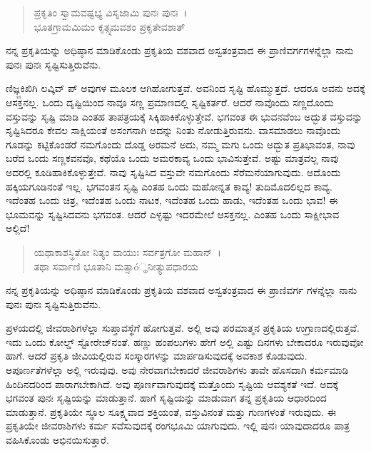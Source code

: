 \begin{verse}
ಪ್ರಕೃತಿಂ ಸ್ವಾಮವಷ್ಟಭ್ಯ ವಿಸೃಜಾಮಿ ಪುನಃ ಪುನಃ~।\\ಭೂತಗ್ರಾಮಮಿಮಂ ಕೃತ್ಸ್ನಮವಶಂ ಪ್ರಕೃತೇವಶಾತ್ 
\end{verse}

ನನ್ನ ಪ್ರಕೃತಿಯನ್ನು ಅಧಿಷ್ಠಾನ ಮಾಡಿಕೊಂಡು ಪ್ರಕೃತಿಯ ವಶವಾದ ಅಸ್ವತಂತ್ರವಾದ ಈ ಪ್ರಾಣಿವರ್ಗಗಳನ್ನೆಲ್ಲಾ ನಾನು ಪುನಃ ಪುನಃ ಸೃಷ್ಟಿಸುತ್ತಿರುವೆನು.

ಣಿಜ್ಞ್ಜಕಿಖಿಗಿ ಲವ್ಕಿವ್ ಪ್ ಅವುಗಳ ಮೂಲಕ ಆಗಿಹೋಗುತ್ತವೆ. ಅವನಿಂದ ಸೃಷ್ಟಿ ಹೊಮ್ಮುತ್ತದೆ. ಆದರೂ ಅವನು ಅದಕ್ಕೆ ಆಸಕ್ತನಲ್ಲ. ಒಂದು ದೃಷ್ಟಿಯಿಂದ ನಾವೂ ಸಣ್ಣ ಪ್ರಮಾಣದಲ್ಲಿ ಸೃಷ್ಟಿಕರ್ತರೆ. ಆದರೆ ನಾವೊಂದು ಸಣ್ಣದೊಂದು ವಸ್ತುವನ್ನು ಸೃಷ್ಟಿ ಮಾಡಿ ಎಂತಹ ತಾಪತ್ರಯಕ್ಕೆ ಸಿಕ್ಕಿಹಾಕಿಕೊಳ್ಳುತ್ತೇವೆ. ಭಗವಂತ ಈ ಭುವನವೆಂಬ ಅದ್ಭುತ ವಸ್ತುವನ್ನು ಸೃಷ್ಟಿಸಿದರೂ ಕೇವಲ ಸಾಕ್ಷಿಯಂತೆ ಅಸಂಗನಾಗಿ ಅದನ್ನು ನಿಂತು ನೋಡುತ್ತಿರುವನು. ವಾಸಮಾಡಲು ನಾವೊಂದು ಗೂಡನ್ನು ಕಟ್ಟಿಕೊಂಡರೆ ನಮಗೊಂದು ದೊಡ್ಡ ಅರಮನೆ ಅದು, ನಮ್ಮ ಮಗು ಒಂದು ಅದ್ಭುತ ಪ್ರತಿಭಾವಂತ, ನಾವು ಬರೆದ ಒಂದು ಸಣ್ಣಕವನವೊ, ಕಥೆಯೊ ಒಂದು ಅಮರಕಾವ್ಯ ಒಂದು ಭಾವಿಸುತ್ತೇವೆ. ಅಷ್ಟು ಮಾತ್ರವಲ್ಲ ನಾವು ಅದರಲ್ಲಿ ಕೂಡಿಹಾಕಿಕೊಳ್ಳುತ್ತೇವೆ. ನಾವು ಸೃಷ್ಟಿಸಿದ ವಸ್ತುವೇ ನಮಗೊಂದು ಸೆರೆಮನೆಯಾಗುವುದು. ಅದೊಂದು ಹಕ್ಕಿಯಗೂಡಿನಂತೆ ಇಲ್ಲ. ಭಗವಂತನ ಸೃಷ್ಟಿ ಎಂತಹ ಒಂದು ಮಹೋನ್ನತ ಕಾವ್ಯ! ತುದಿಮೊದಲಿಲ್ಲದ ಕಾವ್ಯ. ಇದೆಂತಹ ಒಂದು ಚಿತ್ರ, ಇದೆಂತಹ ಒಂದು ನಾಟಕ, ಇದೆಂತಹ ಒಂದು ಹಾಡು, ಇದೆಂತಹ ಒಂದು ಭಾವ! ಈ ಭೂಮವನ್ನು ಸೃಷ್ಟಿಸಿದವನು ಭಗವಂತ. ಆದರೆ ಎಳ್ಳಷ್ಟು ಇದರಮೇಲೆ ಆಸಕ್ತನಲ್ಲ. ಎಂತಹ ಒಂದು ಸಾಕ್ಷೀಭಾವ ಅಲ್ಲಿದೆ!

\begin{verse}
ಯಥಾಕಾಶಸ್ಥಿತೋ ನಿತ್ಯಂ ವಾಯುಃ ಸರ್ವತ್ರಗೋ ಮಹಾನ್~।\\ತಥಾ ಸರ್ವಾಣಿ ಭೂತಾನಿ ಮತ್ಸಾó್ಥನೀತ್ಯುಪಧಾರಯ 
\end{verse}

{\small ನನ್ನ ಪ್ರಕೃತಿಯನ್ನು ಅಧಿಷ್ಠಾನ ಮಾಡಿಕೊಂಡು ಪ್ರಕೃತಿಯ ವಶವಾದ ಅಸ್ವತಂತ್ರವಾದ ಈ ಪ್ರಾಣಿವರ್ಗ ಗಳನ್ನೆಲ್ಲಾ ನಾನು ಪುನಃ ಪುನಃ ಸೃಷ್ಟಿಸುತ್ತಿರುವೆನು.}

ಪ್ರಳಯದಲ್ಲಿ ಜೀವರಾಶಿಗಳೆಲ್ಲಾ ಸುಪ್ತಾವಸ್ಥೆಗೆ ಹೋಗುತ್ತವೆ. ಅಲ್ಲಿ ಅವು ಪರಮಾತ್ಮನ ಪ್ರಕೃತಿಯ ಉಗ್ರಾಣದಲ್ಲಿರುತ್ತವೆ. ಇದು ಒಂದು ಕೋಲ್ಡ್ ಸ್ಟೋರೇಜ್​ನಂತೆ. ಹಣ್ಣು ಹಂಪಲುಗಳು ಹೇಗೆ ಅಲ್ಲಿ ಎಷ್ಟು ದಿನಗಳು ಬೇಕಾದರೂ ಇರುವುವೋ ಹಾಗೆ. ಆದರೆ ಪ್ರಕೃತಿ ಜೀವಿಯಲ್ಲಿರುವ ಸಂಸ್ಕಾರಗಳನ್ನು ಮಾರ್ಪಡಿಸುವುದಕ್ಕೆ ಅವಕಾಶ ಕೊಡುವುದು. ಅಪೂರ್ಣತೆಗಳೆಲ್ಲಾ ಅಲ್ಲಿ ಇರುವುವು. ಅವು ನೇರವಾಗಬೇಕಾದರೆ ಜೀವರಾಶಿಗಳು ತಾವೇ ಹೊಸದಾಗಿ ಕರ್ಮಮಾಡಿ ಹಿಂದಿನದರಿಂದ ಪಾರಾಗಬೇಕಾಗಿದೆ. ಅವು ಪೂರ್ಣವಾಗುವುದಕ್ಕೆ ಮತ್ತೊಂದು ಸೃಷ್ಟಿಯ ಆವಶ್ಯಕತೆ ಇದೆ. ಅದಕ್ಕೆ ಭಗವಂತ ಪುನಃ ಸೃಷ್ಟಿಯನ್ನು ಮಾಡುತ್ತಾನೆ. ಹಾಗೆ ಸೃಷ್ಟಿಯನ್ನು ಮಾಡುವಾಗ ತನ್ನ ಪ್ರಕೃತಿಯ ಆಧಾರದಿಂದ ಮಾಡುತ್ತಾನೆ. ಪ್ರಕೃತಿಯೇ ಸ್ಥೂಲ ಸೂಕ್ಷ್ಮವಾದ ಶಕ್ತಿಯಂತೆ, ವಸ್ತುವಿನಂತೆ ಮತ್ತು ಗುಣಗಳಂತೆ ಇರುವುದು. ಈ ಪ್ರಕೃತಿಯೇ ಜೀವರಾಶಿಗಳು ಕರ್ಮ ಸವೆಸುವುದಕ್ಕೆ ರಂಗಭೂಮಿ ಯಾಗುವುದು. ಇಲ್ಲಿ ಪುನಃ ಯಾವುದಾದರೂ ಪಾತ್ರ ವಹಿಸಿಕೊಂಡು ಅಭಿನಯಿಸುತ್ತಾರೆ.


